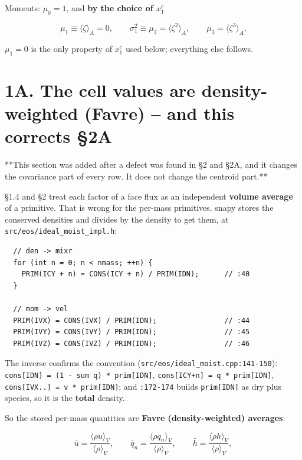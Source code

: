 \documentclass[11pt,a4paper]{article}
\begin{document}
Moments: $\mu_0=1$, and \textbf{by the choice of $x_1^c$}

\begin{equation*}
\mu_1 \equiv \langle\zeta\rangle_A = 0,
\qquad
\sigma_1^2 \equiv \mu_2 = \langle\zeta^2\rangle_A,
\qquad
\mu_3 = \langle\zeta^3\rangle_A .
\tag{1.10}
\end{equation*}

$\mu_1=0$ is the only property of $x_1^c$ used below; everything else follows.

\hrulefill

\section*{1A. The cell values are density-weighted (Favre) -- and this corrects §2A}

**This section was added after a defect was found in §2 and §2A, and it changes
the covariance part of every row. It does not change the centroid part.**

§1.4 and §2 treat each factor of a face flux as an independent \textbf{volume average}
of a primitive. That is wrong for the per-mass primitives. snapy stores the
conserved densities and divides by the density to get them, at
\texttt{src/eos/ideal\_moist\_impl.h}:

\begin{lstlisting}
  // den -> mixr
  for (int n = 0; n < nmass; ++n) {
    PRIM(ICY + n) = CONS(ICY + n) / PRIM(IDN);      // :40
  }

  // mom -> vel
  PRIM(IVX) = CONS(IVX) / PRIM(IDN);                // :44
  PRIM(IVY) = CONS(IVY) / PRIM(IDN);                // :45
  PRIM(IVZ) = CONS(IVZ) / PRIM(IDN);                // :46
\end{lstlisting}

The inverse confirms the convention (\texttt{src/eos/ideal\_moist.cpp:141-150}):
\texttt{cons[IDN] = (1 - sum q) * prim[IDN]}, \texttt{cons[ICY+n] = q * prim[IDN]},
\texttt{cons[IVX..] = v * prim[IDN]}; and \texttt{:172-174} builds \texttt{prim[IDN]} as dry plus
species, so it is the \textbf{total} density.

So the stored per-mass quantities are \textbf{Favre (density-weighted) averages}:

\begin{equation*}
\bar u=\frac{\langle\rho u\rangle_V}{\langle\rho\rangle_V},\qquad
\bar q_n=\frac{\langle\rho q_n\rangle_V}{\langle\rho\rangle_V},\qquad
\bar h=\frac{\langle\rho h\rangle_V}{\langle\rho\rangle_V},
\tag{1A.1}
\end{equation*}
\end{document}
